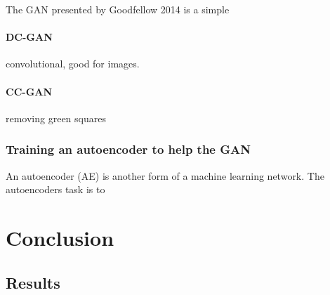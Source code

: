 \documentclass[a4paper,english]{ifimaster}
\begin{document}
The GAN presented by Goodfellow 2014 is a simple

\subsection{DC-GAN}
  convolutional, good for images.  
\subsection{CC-GAN}
  removing green squares

\section{Training an autoencoder to help the GAN}
An autoencoder (AE) is another form of a machine learning network. The autoencoders task is to  

\part{Conclusion}

\chapter{Results}

\backmatter{}

\printbibliography
\end{document}
